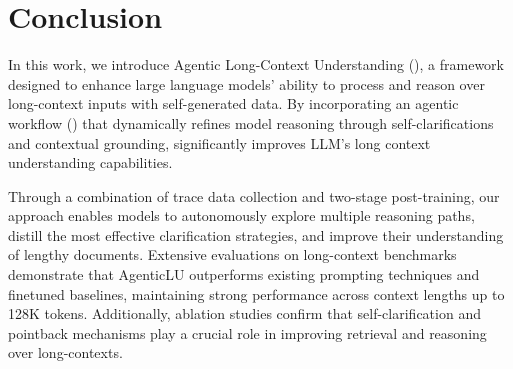 \section{Conclusion}
\label{sec:conclusion}

In this work, we introduce Agentic Long-Context Understanding (\method), a framework designed to enhance large language models' ability to process and reason over long-context inputs with self-generated data. 
By incorporating an agentic workflow (\coc) that dynamically refines model reasoning through self-clarifications and contextual grounding, \method significantly improves LLM's long context understanding capabilities.

Through a combination of trace data collection and two-stage post-training, our approach enables models to autonomously explore multiple reasoning paths, distill the most effective clarification strategies, and improve their understanding of lengthy documents. 
Extensive evaluations on long-context benchmarks demonstrate that AgenticLU outperforms existing prompting techniques and finetuned baselines, maintaining strong performance across context lengths up to 128K tokens. 
Additionally, ablation studies confirm that self-clarification and pointback mechanisms play a crucial role in improving retrieval and reasoning over long-contexts.

